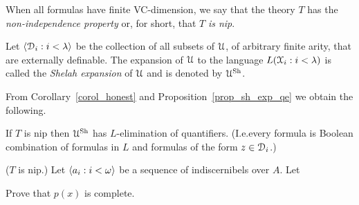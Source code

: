 When all formulas have finite VC-dimension, we say that the theory $T$ has the \emph{non-independence property\/} or, for short, that $T$ \emph{is nip}.

Let $\langle\EuScript D_i:i<\lambda\rangle$ be the collection of all subsets of $\EuScript U$, of arbitrary finite arity, that are externally definable. The expansion of $\EuScript U$ to the language $L(\EuScript X_i:i<\lambda)$ is called the \emph{Shelah expansion\/} of $\EuScript U$ and is denoted by \emph{$\EuScript U^{\rm Sh}$}. 

From Corollary~\ref{corol_honest} and Proposition~\ref{prop_sh_exp_qe} we obtain the following.

\begin{corollary}\label{corol_sh_exp_qe}
If $T$ is nip then $\EuScript U^{\rm Sh}$ has $L$-elimination of quantifiers. (I.e.\@ every formula is Boolean combination of formulas in $L$ and formulas of the form $z\in\EuScript D_i$.)
\end{corollary}

\begin{exercise}
  ($T$ is nip.)
  Let $\langle a_i:i<\omega\rangle$ be a sequence of indiscernibels over $A$.
  Let 
  

  Prove that $p(x)$ is complete.
\end{exercise}


